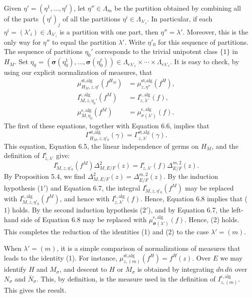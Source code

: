 \documentclass{amsart}
\begin{document}
Given $\eta' = (\eta^1,\ldots,\eta^\ell)$, let $\eta''\in\Lambda_m$ be the
partition obtained by combining all of the parts $(\eta^i)_j$ of all the
partitions $\eta^i\in\Lambda_{\lambda'_i}$.  In particular, if each
$\eta^i = (\lambda'_i)\in\Lambda_{\lambda'_i}$ is a partition with one part,
then $\eta''=\lambda'$.  Moreover, this is the only way for $\eta''$ to
equal the partition $\lambda'$.  Write $\eta'_0$ for this sequence of partitions.
The sequence of partitions $\eta_0'$ corresponds to the trivial unipotent class $\{1\}$ in $H_M$.
Set 
$\eta_0 = (\pmb\sigma(\eta^1_0),\ldots,\pmb\sigma(\eta_0^\ell))\in
  \Lambda_{r\lambda'_1}\times\cdots\times \Lambda_{r\lambda'_\ell}$.
It is easy to check, by using our explicit normalization of measures, that
\begin{align}\label{eqn:6.7}
  \mu^{\text{st,alg}}_{H_M,z,\eta'}(f^{H_M}) &= \mu^{\text{st,alg}}_{z,\eta''}(f^H),\\
  I^{\epsilon,\text{alg}}_{M,z,\eta_0'}(f^M) &= I^{\epsilon,\text{alg}}_{z,\lambda'}(f),\\
  \mu^{\epsilon,\text{alg}}_{M,\eta_0}(f^M)
     &= \mu^{\epsilon,\text{alg}}_{\sigma(\lambda')}(f).
\end{align}
The first of these equations, together with Equation 6.6, implies that
$$\Gamma^{\text{st,alg}}_{H_M,z,\eta'_0} (\gamma)
         = \Gamma^{\text{st,alg}}_{z,\lambda'}(\gamma).$$
This equation, Equation 6.5, the linear independence of germs on $H_M$, and the
definition of $I^\epsilon_{z,\lambda'}$ give:
\begin{equation}\label{eqn:6.8}
I^\epsilon_{M,z,\eta'_0}(f^M)\Delta^{2}_{M,E/F}(z)
      = I^\epsilon_{z,\lambda'}(f)\Delta^{m,2}_{E/F}(z).%
\end{equation}
%
By Proposition 5.4, we find $\Delta^{2}_{M,E/F}(z) = \Delta^{m,2}_{E/F}(z)$.
By the induction hypothesis ($1'$) and Equation 6.7, 
the integral $I^\epsilon_{M,z,\eta'_0}(f^M)$ may be replaced
with $I^{\epsilon,\text{alg}}_{M,z,\eta'_0}(f^M)$,
and hence with $I^{\epsilon,\text{alg}}_{z,\lambda'}(f)$.
Hence, Equation 6.8 implies that ($1$) holds.  By the second induction hypothesis ($2'$), and by 
Equation 6.7,
the left-hand side of Equation 6.8 may be replaced with
$\mu^{\epsilon,\text{alg}}_{\pmb\sigma(\lambda')}(f)$.  Hence, (2) holds.
This completes the reduction of the identities (1) and (2) to the case $\lambda'=(m)$.
\bigskip

When $\lambda'=(m)$, it is a simple comparison of normalizations of measures that leads to the
identity (1).  For instance, $\mu^{\text{st,alg}}_{z,(m)}(f^H) =
f^H(z)$. Over $E$ we may identify $H$ and $M_\sigma$, and
descent to $H$ or $M_\sigma$ is obtained by integrating $dn\,d\bar n$ over
$N_\sigma$ and $\bar N_\sigma$.  This, by definition, is the measure used
in the definition of $I^{\epsilon,\text{alg}}_{z,(m)}$.  This gives the result.
\end{document}
